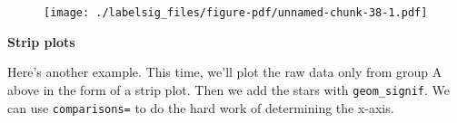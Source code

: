 \documentclass[
  letterpaper,
  DIV=11,
  numbers=noendperiod]{scrreprt}
\newenvironment{Shaded}{\begin{snugshade}}{\end{snugshade}}
\newcommand{\AttributeTok}[1]{\textcolor[rgb]{0.40,0.45,0.13}{#1}}
\newcommand{\FunctionTok}[1]{\textcolor[rgb]{0.28,0.35,0.67}{#1}}
\newcommand{\NormalTok}[1]{\textcolor[rgb]{0.00,0.23,0.31}{#1}}
\newcommand{\OtherTok}[1]{\textcolor[rgb]{0.00,0.23,0.31}{#1}}
\newcommand{\SpecialCharTok}[1]{\textcolor[rgb]{0.37,0.37,0.37}{#1}}
\newcommand{\StringTok}[1]{\textcolor[rgb]{0.13,0.47,0.30}{#1}}
\begin{document}
\begin{figure}[H]

{\centering \texttt{[image: ./labelsig\_files/figure-pdf/unnamed-chunk-38-1.pdf]}

}

\end{figure}

\textbf{Strip plots}

Here's another example. This time, we'll plot the raw data only from
group A above in the form of a strip plot. Then we add the stars with
\texttt{geom\_signif}. We can use \texttt{comparisons=} to do the hard
work of determining the x-axis.

\begin{Shaded}
\end{Shaded}
\end{document}
